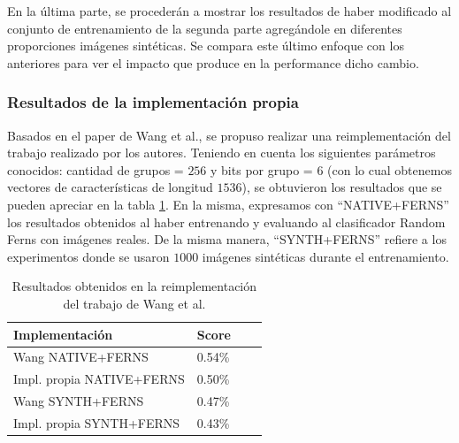 	En la última parte, se procederán a mostrar los resultados de haber modificado al conjunto de entrenamiento de la segunda parte agregándole en diferentes proporciones imágenes sintéticas. Se compara este último enfoque con los anteriores para ver el impacto que produce en la performance dicho cambio.
	
	\subsubsection{Resultados de la implementación propia}
	
	Basados en el paper de Wang et al., se propuso realizar una reimplementación del trabajo realizado por los autores. Teniendo en cuenta los siguientes parámetros conocidos: cantidad de grupos = $256$ y bits por grupo = $6$ (con lo cual obtenemos vectores de características de longitud $1536$), se obtuvieron los resultados que se pueden apreciar en la tabla \ref{table: Baseline-Table}. En la misma, expresamos con ``NATIVE+FERNS'' los resultados obtenidos al haber entrenando y evaluando al clasificador Random Ferns con imágenes reales. De la misma manera, ``SYNTH+FERNS'' refiere a los experimentos donde se usaron $1000$ imágenes sintéticas durante el entrenamiento.
	
	\begin{table}
		\centering
	    \begin{tabular}{ | l | l | l | p{5cm} |}
    			\hline
    				\textbf{Implementación} & \textbf{Score} \\ \hline
    				Wang NATIVE+FERNS & 0.54\% \\ \hline
    				Impl. propia NATIVE+FERNS & 0.50\% \\ \hline
    				Wang SYNTH+FERNS & 0.47\% \\ \hline
    				Impl. propia SYNTH+FERNS & 0.43\% \\
    				
    			\hline
    		\end{tabular}	
    		\caption[Resultados reales y sintéticas para baseline]{Resultados obtenidos en la reimplementación del trabajo de Wang et al.}
    		\label{table: Baseline-Table}
	\end{table}
	
